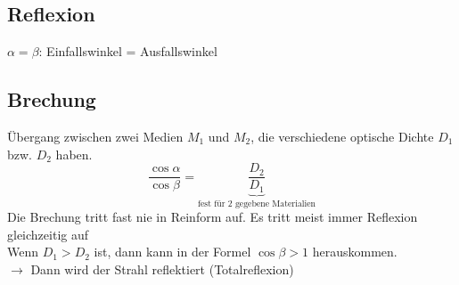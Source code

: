 \subsection{Reflexion}
\begin{center}
\end{center}
$\alpha = \beta$: Einfallswinkel = Ausfallswinkel

\subsection{Brechung}
\begin{center}
\end{center}
Übergang zwischen zwei Medien $M_1$ und $M_2$, die verschiedene optische Dichte $D_1$ bzw. $D_2$ haben.
\[\frac{\cos \alpha}{\cos \beta} = \underbrace{\frac{D_2}{D_1}}_{\text{fest für 2 gegebene Materialien}}\]
Die Brechung tritt fast nie in Reinform auf. Es tritt meist immer Reflexion gleichzeitig auf\\
Wenn $D_1 > D_2$ ist, dann kann in der Formel $\cos \beta > 1$ herauskommen.\\
$\rightarrow$ Dann wird der Strahl reflektiert (Totalreflexion)
